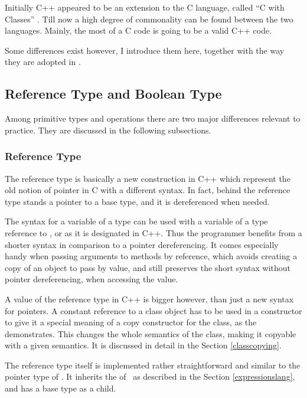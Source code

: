 
Initially C++ appeared to be an extension to the C language, called ``C with Classes'' \cite{cwithclasses}. Till now a high degree
of commonality can be found between the two languages. Mainly, the most of a C code is going to be a valid C++ code. 

Some differences exist however, I introduce them here, together with the way they are adopted in \pcpp.

\subsection{Reference Type and Boolean Type}

Among primitive types and operations there are two major differences relevant to practice.
They are discussed in the following subsections.

\subsubsection{Reference Type}

The reference type is basically a new construction in C++ which represent the old notion of pointer in C with a different syntax.
In fact, behind the reference type stands a pointer to a base type, and it is dereferenced when needed. 

The syntax for a variable of a type  can be used with a variable of a type reference to , or  as it is designated in C++.
Thus the programmer benefits from a shorter syntax in comparison to a pointer dereferencing. It comes especially handy when passing arguments to methods by reference, which avoids creating a copy of an object to pass by 
value, and still preserves the short syntax without pointer dereferencing, when accessing the value.


A value of the reference type in C++ is bigger however, than just a new syntax for pointers. A constant reference to a class object 
has to be used in a constructor to give it a special meaning of a copy constructor for the class, as the  demonstrates.
This changes the whole semantics of the class, making it copyable with a given semantics. 
It is discussed in detail in the Section \ref{classcopying}.

The reference type itself is implemented rather straightforward and similar to the pointer type of \mbdr. It inherits the  
 of \mbdr\, as described in the Section \ref{expressionslang}, and has a base type as a child.



